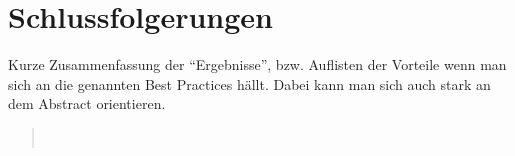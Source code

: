 \section{Schlussfolgerungen}
\label{sec:schlussfolgerungen}

\begin{wichtigbox}
Kurze Zusammenfassung der \enquote{Ergebnisse}, bzw. Auflisten der Vorteile
wenn man sich an die genannten Best Practices hällt. Dabei kann man sich auch
stark an dem Abstract orientieren.
\end{wichtigbox}

\begin{quote}
~\cite{digg4}
\end{quote}
